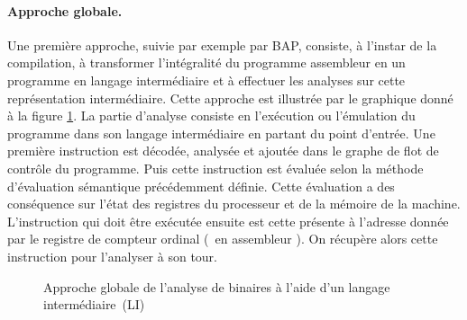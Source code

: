 \paragraph{Approche globale.}
Une première approche, suivie par exemple par BAP, consiste, à l'instar de la compilation, à transformer l'intégralité du programme assembleur en un programme en langage intermédiaire et à effectuer les analyses sur cette représentation intermédiaire.
Cette approche est illustrée par le graphique donné à la figure \ref{fig:diag_approche_globale}. La partie d'analyse consiste en l'exécution ou l'émulation du programme dans son langage intermédiaire en partant du point d'entrée.
Une première instruction est décodée, analysée et ajoutée dans le graphe de flot de contrôle du programme. Puis cette instruction est évaluée selon la méthode d'évaluation sémantique précédemment définie.
Cette évaluation a des conséquence sur l'état des registres du processeur et de la mémoire de la machine.
L'instruction qui doit être exécutée ensuite est cette présente à l'adresse donnée par le registre de compteur ordinal (\eip\ en assembleur \xq). On récupère alors cette instruction pour l'analyser à son tour.

\begin{figure}[h]
\begin{center}
\end{center}
\caption{Approche globale de l'analyse de binaires à l'aide d'un langage intermédiaire~(LI)}
\label{fig:diag_approche_globale}
\end{figure}


